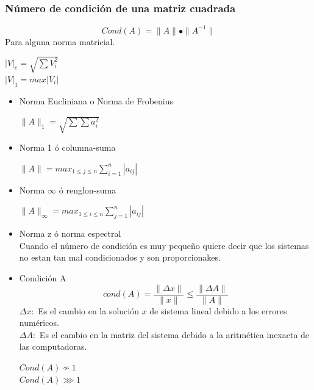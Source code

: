 \subsubsection*{N\'umero de condici\'on de una matriz cuadrada}
\begin{displaymath}
Cond(A)=\parallel A \parallel \bullet \parallel A^{-1} \parallel
\end{displaymath}
Para alguna norma matricial.
\begin{center}
$|V|_e=\sqrt{\sum V_i^2}$\\
$|V|_1=max|V_i|$
\end{center}
\begin{itemize}
\item Norma Eucliniana o Norma de Frobenius\\
\begin{center}
$\parallel A \parallel _1 = \sqrt{\sum \sum a_i^2}$
\end{center}
\item Norma 1 \'o columna-suma\\
\begin{center}
$\parallel A \parallel = max_{1\leq j\leq n}\sum_{i=1}^{n}|a_{ij}|$
\end{center}
\item Norma $\infty$ \'o renglon-suma\\
\begin{center}
$\parallel A \parallel _{\infty} = max_{1\leq i\leq n}\sum_{j=1}^{n}|a_{ij}|$\end{center}
\item Norma z \'o norma espectral\\
Cuando el n\'umero de condici\'on es muy pequeño quiere decir que los sistemas no estan tan mal condicionados y son proporcionakes. 
\item Condici\'on A \begin{displaymath}
cond(A)=\frac{\parallel \Delta x \parallel }{\parallel x \parallel}\leq \frac{\parallel \Delta A \parallel }{\parallel A \parallel} 
\end{displaymath}
$\Delta x:$ Es el cambio en la soluci\'on $x$ de sistema lineal debido a los errores num\'ericos. \\
$\Delta A:$ Es el cambio en la matriz del sistema debido a la aritm\'etica inexacta de las computadoras.
\begin{center}
$Cond(A)\nsim 1$\\
$Cond(A)\ggg 1 $
\end{center}
\end{itemize} 
